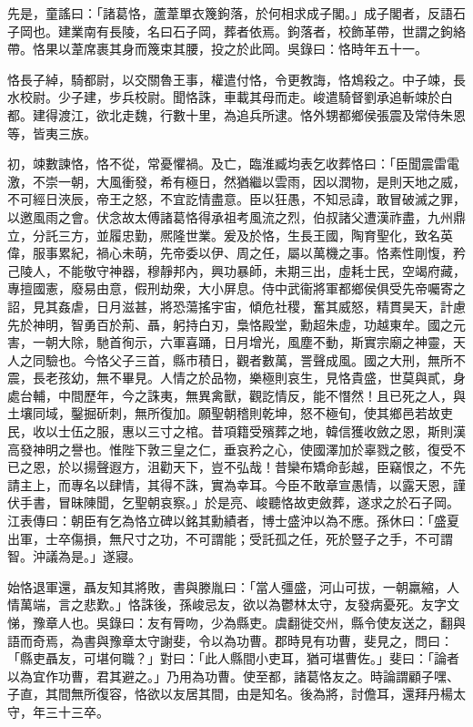 \begin{pinyinscope}
先是，童謠曰：「諸葛恪，蘆葦單衣篾鉤落，於何相求成子閣。」成子閣者，反語石子岡也。建業南有長陵，名曰石子岡，葬者依焉。鉤落者，校飾革帶，世謂之鉤絡帶。恪果以葦席裹其身而篾束其腰，投之於此岡。吳錄曰：恪時年五十一。

恪長子綽，騎都尉，以交關魯王事，權遣付恪，令更教誨，恪鴆殺之。中子竦，長水校尉。少子建，步兵校尉。聞恪誅，車載其母而走。峻遣騎督劉承追斬竦於白都。建得渡江，欲北走魏，行數十里，為追兵所逮。恪外甥都鄉侯張震及常侍朱恩等，皆夷三族。

初，竦數諫恪，恪不從，常憂懼禍。及亡，臨淮臧均表乞收葬恪曰：「臣聞震雷電激，不崇一朝，大風衝發，希有極日，然猶繼以雲雨，因以潤物，是則天地之威，不可經日浹辰，帝王之怒，不宜訖情盡意。臣以狂愚，不知忌諱，敢冒破滅之罪，以邀風雨之會。伏念故太傅諸葛恪得承祖考風流之烈，伯叔諸父遭漢祚盡，九州鼎立，分託三方，並履忠勤，熈隆世業。爰及於恪，生長王國，陶育聖化，致名英偉，服事累紀，禍心未萌，先帝委以伊、周之任，屬以萬機之事。恪素性剛愎，矜己陵人，不能敬守神器，穆靜邦內，興功暴師，未期三出，虛耗士民，空竭府藏，專擅國憲，廢易由意，假刑劫衆，大小屏息。侍中武衞將軍都鄉侯俱受先帝囑寄之詔，見其姦虐，日月滋甚，將恐蕩搖宇宙，傾危社稷，奮其威怒，精貫昊天，計慮先於神明，智勇百於荊、聶，躬持白刃，梟恪殿堂，勳超朱虛，功越東牟。國之元害，一朝大除，馳首徇示，六軍喜踊，日月增光，風塵不動，斯實宗廟之神靈，天人之同驗也。今恪父子三首，縣市積日，觀者數萬，詈聲成風。國之大刑，無所不震，長老孩幼，無不畢見。人情之於品物，樂極則哀生，見恪貴盛，世莫與貳，身處台輔，中間歷年，今之誅夷，無異禽獸，觀訖情反，能不憯然！且已死之人，與土壤同域，鑿掘斫刺，無所復加。願聖朝稽則乾坤，怒不極旬，使其鄉邑若故吏民，收以士伍之服，惠以三寸之棺。昔項籍受殯葬之地，韓信獲收斂之恩，斯則漢高發神明之譽也。惟陛下敦三皇之仁，垂哀矜之心，使國澤加於辜戮之骸，復受不已之恩，於以揚聲遐方，沮勸天下，豈不弘哉！昔欒布矯命彭越，臣竊恨之，不先請主上，而專名以肆情，其得不誅，實為幸耳。今臣不敢章宣愚情，以露天恩，謹伏手書，冒昧陳聞，乞聖朝哀察。」於是亮、峻聽恪故吏斂葬，遂求之於石子岡。江表傳曰：朝臣有乞為恪立碑以銘其勳績者，博士盛沖以為不應。孫休曰：「盛夏出軍，士卒傷損，無尺寸之功，不可謂能；受託孤之任，死於豎子之手，不可謂智。沖議為是。」遂寢。

始恪退軍還，聶友知其將敗，書與滕胤曰：「當人彊盛，河山可拔，一朝羸縮，人情萬端，言之悲歎。」恪誅後，孫峻忌友，欲以為鬱林太守，友發病憂死。友字文悌，豫章人也。吳錄曰：友有脣吻，少為縣吏。虞翻徙交州，縣令使友送之，翻與語而奇焉，為書與豫章太守謝斐，令以為功曹。郡時見有功曹，斐見之，問曰：「縣吏聶友，可堪何職？」對曰：「此人縣間小吏耳，猶可堪曹佐。」斐曰：「論者以為宜作功曹，君其避之。」乃用為功曹。使至都，諸葛恪友之。時論謂顧子嘿、子直，其間無所復容，恪欲以友居其間，由是知名。後為將，討儋耳，還拜丹楊太守，年三十三卒。


\end{pinyinscope}